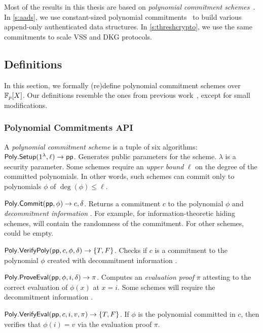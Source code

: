 Most of the results in this thesis are based on \textit{polynomial commitment schemes}~\cite{Feldman87,Pedersen1991Non,KZG10a,BFS19,ZXZS19}.
In \cref{s:aads}, we use constant-sized polynomial commitments~\cite{KZG10a} to build various append-only authenticated data structures.
In \cref{s:threshcrypto}, we use the same commitments to scale VSS and DKG protocols.

\subsection{Definitions}
In this section, we formally (re)define polynomial commitment schemes over $\mathbb{F}_p[X]$.
Our definitions resemble the ones from previous work~\cite{KZG10a}, except for small modifications.

\subsubsection{Polynomial Commitments API}
\label{s:prelim:polycommit:api}
A \textit{polynomial commitment scheme} is a tuple of six algorithms:
\\

\api $\mathsf{Poly.Setup}(1^\lambda, \ell)\rightarrow \mathsf{pp}$.
Generates public parameters \pp for the scheme.
$\lambda$ is a security parameter.
Some schemes require an \textit{upper bound} $\ell$ on the degree of the committed polynomials.
In other words, such schemes can commit only to polynomials $\phi$ of $\deg(\phi)\le \ell$.

\api $\mathsf{Poly.Commit}(\mathsf{pp}, \phi)\rightarrow c, \delta$.
Returns a commitment $c$ to the polynomial $\phi$ and \textit{decommitment information} \decominfo.
For example, for information-theoretic hiding schemes, \decominfo will contain the randomness of the commitment.
For other schemes, \decominfo could be empty.

\api $\mathsf{Poly.VerifyPoly}(\mathsf{pp}, c, \phi, \delta)\rightarrow \{T,F\}$.
Checks if $c$ is a commitment to the polynomial $\phi$ created with decommitment information \decominfo.

\api $\mathsf{Poly.ProveEval}(\mathsf{pp}, \phi, i, \delta)\rightarrow \pi$.
Computes an \textit{evaluation proof} $\pi$ attesting to the correct evaluation of $\phi(x)$ at $x=i$.
Some schemes will require the decommitment information \decominfo.

\api $\mathsf{Poly.VerifyEval{}}(\mathsf{pp}, c, i, v, \pi)\rightarrow \{T,F\}$.
If $\phi$ is the polynomial committed in $c$, then verifies that $\phi(i)=v$ via the evaluation proof $\pi$.

